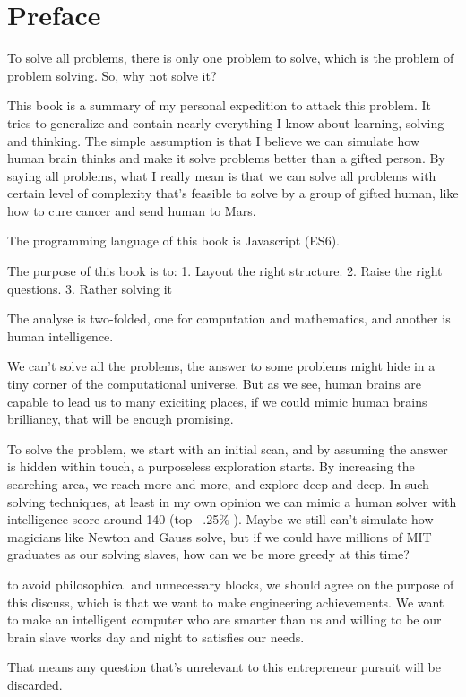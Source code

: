 \chapter*{Preface}

To solve all problems, there is only one problem to solve, which is the problem of problem solving. So, why not solve it?

This book is a summary of my personal expedition to attack this problem. It tries to generalize and contain nearly everything I know about learning, solving and thinking. The simple assumption is that I believe we can simulate how human brain thinks and make it solve problems better than a gifted person. By saying all problems, what I really mean is that we can solve all problems  with certain level of complexity that's feasible to solve by a group of gifted human, like how to cure cancer and send human to Mars.

The programming language of this book is Javascript (ES6).

 The purpose of this book is to: 1. Layout the right structure. 2. Raise the right questions. 3. Rather solving it

 The analyse is two-folded, one for computation and mathematics, and another is human intelligence.

 We can't solve all the problems, the answer to some problems might hide in a tiny corner of the computational universe. But as we see, human brains are capable to lead us to many exiciting places, if we could mimic human brains brilliancy, that will be enough promising.

 To solve the problem, we start with an initial scan, and by assuming the answer is hidden within touch, a purposeless exploration starts. By increasing the searching area, we reach more and more, and explore deep and deep. In such solving techniques, at least in my own opinion we can mimic a human solver with intelligence score around 140 (top ~.25\% ). Maybe we still can't simulate how magicians like Newton and Gauss solve, but if we could have millions of MIT graduates as our solving slaves, how can we be more greedy at this time?

 to avoid philosophical and unnecessary blocks, we should agree on the purpose of this discuss, which is that we want to make engineering achievements. We want to make an intelligent computer who are smarter than us and willing to be our brain slave works day and night to satisfies our needs.

 That means any question that's unrelevant to this entrepreneur pursuit will be discarded.

